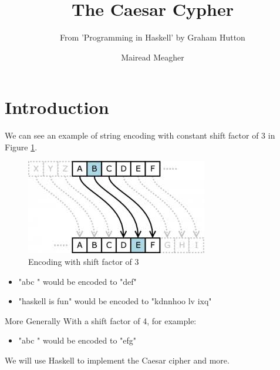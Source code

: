 \documentclass[11pt]{article}
\title{The Caesar Cypher}
\subtitle{From 'Programming in Haskell' by Graham Hutton\cite{hutton}}
\author[MM]{Mairead Meagher}
\institute[Waterford Institute of Technology]{
  Waterford Institute of Technology 
}
\def\frametitle#1{}
\begin{document}
\maketitle

\begin{frame}
    \titlepage
\end{frame}


\section{Introduction}
\begin{frame} [fragile, label = test]

  \frametitle{Caesar Cipher}

We can see an example of string encoding with constant shift factor of 3 in Figure \ref{fig:cipher}.
    \pause

 \begin{figure}[H]
			\centering
			\includegraphics[page=1,width=.5\textwidth]{img/cipher.jpg}
				   \caption{Encoding with shift factor of 3}
		   \label{fig:cipher}
		   \end{figure}
 
 \begin{itemize}
 \item
 "abc " would be encoded to "def"  
 \item
 "haskell is fun" would be encoded to "kdnnhoo lv ixq"

 \end{itemize}
\end{frame}
\begin{frame} [fragile, label = test]

    \frametitle{Caesar Cipher contd..}
More Generally 
With a shift factor of 4, for example:

 \begin{itemize}
 \item
 "abc " would be encoded to "efg"  
  \end{itemize}

We will  use Haskell to implement the Caesar cipher and more.
\end{frame}
 
\end{document}
